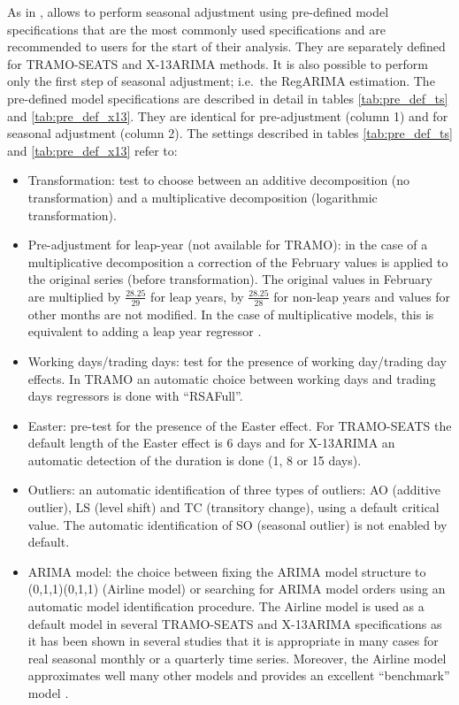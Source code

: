 \documentclass[article]{jss}
\providecommand{\tightlist}{%
  \setlength{\itemsep}{0pt}\setlength{\parskip}{0pt}}
\begin{document}
As in ,  allows to perform seasonal
adjustment using pre-defined model specifications that are the most
commonly used specifications and are recommended to users for the start
of their analysis. They are separately defined for TRAMO-SEATS and
X-13ARIMA methods. It is also possible to perform only the first step of
seasonal adjustment; i.e.~the RegARIMA estimation. The pre-defined model
specifications are described in detail in tables \ref{tab:pre_def_ts}
and \ref{tab:pre_def_x13}. They are identical for pre-adjustment (column
1) and for seasonal adjustment (column 2). The settings described in
tables \ref{tab:pre_def_ts} and \ref{tab:pre_def_x13} refer to:

\begin{itemize}
\tightlist
\item
  Transformation: test to choose between an additive decomposition (no
  transformation) and a multiplicative decomposition (logarithmic
  transformation).\\
\item
  Pre-adjustment for leap-year (not available for TRAMO): in the case of
  a multiplicative decomposition a correction of the February values is
  applied to the original series (before transformation). The original
  values in February are multiplied by \(\frac{28.25}{29}\) for leap
  years, by \(\frac{28.25}{28}\) for non-leap years and values for other
  months are not modified. In the case of multiplicative models, this is
  equivalent to adding a leap year regressor
  \citep{bell1992lengthmonthadj}.\\
\item
  Working days/trading days: test for the presence of working
  day/trading day effects. In TRAMO an automatic choice between working
  days and trading days regressors is done with ``RSAFull''.\\
\item
  Easter: pre-test for the presence of the Easter effect. For
  TRAMO-SEATS the default length of the Easter effect is 6 days and for
  X-13ARIMA an automatic detection of the duration is done (1, 8 or 15
  days).\\
\item
  Outliers: an automatic identification of three types of outliers: AO
  (additive outlier), LS (level shift) and TC (transitory change), using
  a default critical value. The automatic identification of SO (seasonal
  outlier) is not enabled by default.\\
\item
  ARIMA model: the choice between fixing the ARIMA model structure to
  (0,1,1)(0,1,1) (Airline model) or searching for ARIMA model orders
  using an automatic model identification procedure. The Airline model
  is used as a default model in several TRAMO-SEATS and X-13ARIMA
  specifications as it has been shown in several studies that it is
  appropriate in many cases for real seasonal monthly or a quarterly
  time series. Moreover, the Airline model approximates well many other
  models and provides an excellent ``benchmark'' model
  \citep{maravall2009identification}.
\end{itemize}
\end{document}
